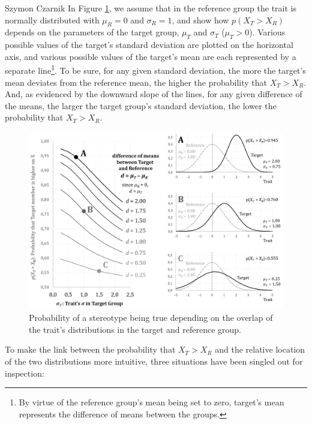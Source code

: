 \begin{artengenv}{Szymon Czarnik}
In Figure \ref{fig1-czar}, we assume that in the reference group the trait is normally
distributed with \(\mu_{R} = 0\) and \(\sigma_{R} = 1\), and show how
\(p\left( X_{T} > X_{R} \right)\) depends on the parameters of the
target group, \(\mu_{T}\) and \(\sigma_{T}\) (\(\mu_{T} > 0\)). Various
possible values of the target's standard deviation are plotted on the
horizontal axis, and various possible values of the target's mean are
each represented by a separate
line\footnote{By virtue of the reference group's mean being set to zero, target's mean represents the
difference of means between the groups.}.
To be sure, for any given
standard deviation, the more the target's mean deviates from the
reference mean, the higher the probability that \(X_{T} > X_{R}\). And,
as evidenced by the downward slope of the lines, for any given
difference of the means, the larger the target group's standard
deviation, the lower the probability that \(X_{T} > X_{R}\).



\begin{figure}[H]
	\centering
   \includegraphics[width=\textwidth]{ART_Czarnik/Czarnik-img009.jpg}
\caption{Probability of a stereotype being true depending on the overlap of the trait's distributions in the target and reference group.}\label{fig1-czar}
\end{figure}



To make the link between the probability that \(X_{T} > X_{R}\) and the
relative location of the two distributions more intuitive, three
situations have been singled out for inspection:


\end{artengenv}
